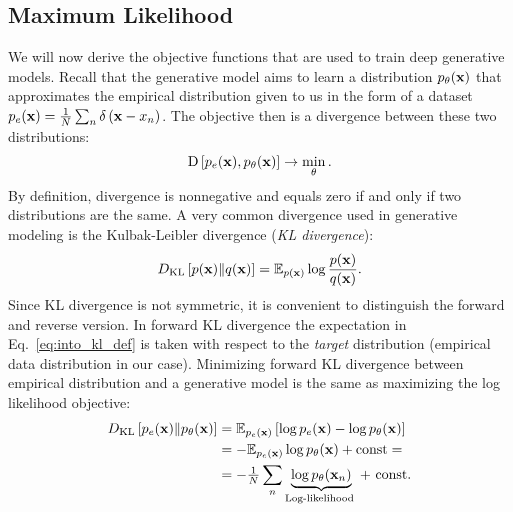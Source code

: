 \subsection{Maximum Likelihood}
We will now derive the objective functions that are used to train deep generative models. 
Recall that the generative model aims to learn a distribution $p_{\theta}({\mathbf{x}})$ that approximates the empirical distribution given to us in the form of a dataset $p_e({\mathbf{x}}) = \frac1N \sum_n \delta\left({\mathbf{x}} - x_n\right)$. 
The objective then is a divergence between these two distributions:
\begin{equation}\label{eq:intro_divergence}
\begin{aligned}
\text{D}\left[p_{e}(\rvx), p_{\theta}(\rvx)\right] \rightarrow \min_{\theta}.
\end{aligned}
\end{equation} 
By definition, divergence is nonnegative and equals zero if and only if two distributions are the same. 
A very common divergence used in generative modeling is the Kulbak-Leibler divergence (\textit{KL divergence}):
\begin{equation}
\begin{aligned} \label{eq:into_kl_def}
 \KL{p(\rvx)}{q(\rvx)} = \E_{p(\rvx)} \log \frac{p(\rvx)}{q(\rvx)}.
\end{aligned}
\end{equation}
Since KL divergence is not symmetric, it is convenient to distinguish the forward and reverse version. In forward KL divergence the expectation in Eq.~\ref{eq:into_kl_def} is taken with respect to the \textit{target} distribution (empirical data distribution in our case). Minimizing forward KL divergence between empirical distribution and a generative model is the same as maximizing the log likelihood objective:
\begin{equation}
\begin{aligned}
D_{\mathrm{KL}}\left[p_{e}({\mathbf{x}})\|p_{\theta}({\mathbf{x}})\right] & =  \mathbb{E}_{p_{e}({\mathbf{x}})}\left[ \log p_{e}({\mathbf{x}}) - \log p_{\theta}({\mathbf{x}})\right] \\
& =  - \mathbb{E}_{p_{e}({\mathbf{x}})} \log p_{\theta}({\mathbf{x}}) + \text{const}=\\
& =  - \tfrac1N \sum_n \underbrace{\log p_{\theta}({\mathbf{x}}_n)}_{\text{Log-likelihood }}  + \text{ const}.
\end{aligned}
\end{equation}
